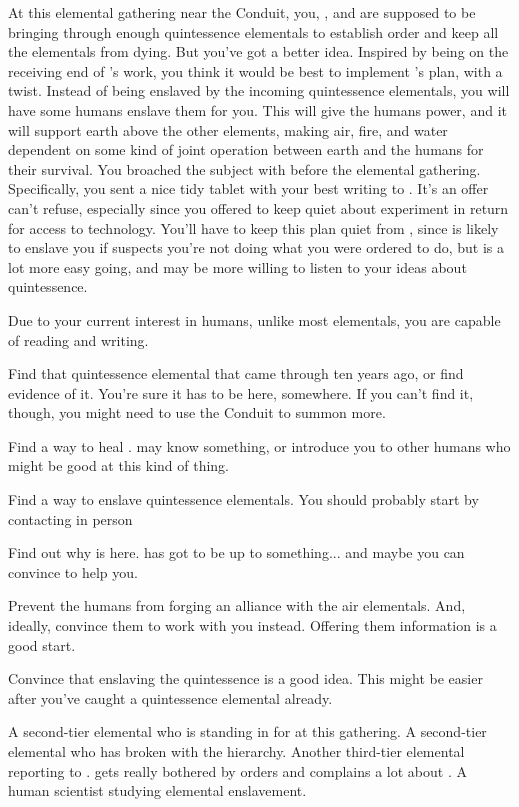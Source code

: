 \documentclass[char]{elementals}
\begin{document}
At this elemental gathering near the Conduit, you, \cLoyal{}, and \cMiniEarth{} are supposed to be bringing through enough quintessence elementals to establish order and keep all the elementals from dying.  But you've got a better idea.  Inspired by being on the receiving end of \cMS{}'s work, you think it would be best to implement \cLoyal{}'s plan, with a twist.  Instead of being enslaved by the incoming quintessence elementals, you will have some humans enslave them for you.  This will give the humans power, and it will support earth above the other elements, making air, fire, and water dependent on some kind of joint operation between earth and the humans for their survival.  You broached the subject with \cMS{} before the elemental gathering.  Specifically, you sent a nice tidy tablet with your best writing to \cMS{\them}.  It's an offer \cMS{} can't refuse, especially since you offered to keep quiet about \cMS{\their} experiment in return for access to \cMS{\their} technology.  You'll have to keep this plan quiet from \cLoyal{}, since \cLoyal{\they} is likely to enslave you if \cLoyal{\they} suspects you're not doing what you were ordered to do, but \cRogue{} is a lot more easy going, and may be more willing to listen to your ideas about quintessence.

Due to your current interest in humans, unlike most elementals, you are capable of reading and writing.

\begin{itemz}[Goals]
	\item Find that quintessence elemental that came through ten years ago, or find evidence of it.  You're sure it has to be here, somewhere. If you can't find it, though, you might need to use the Conduit to summon more.
	\item Find a way to heal \cEarthKing{}.  \cMS{} may know something, or introduce you to other humans who might be good at this kind of thing.
	\item Find a way to enslave quintessence elementals.  You should probably start by contacting \cMS{} in person
	\item Find out why \cRogue{} is here.  \cRogue{\They} has got to be up to something... and maybe you can convince \cRogue{\them} to help you.
	\item Prevent the humans from forging an alliance with the air elementals.  And, ideally, convince them to work with you instead.  Offering them information is a good start.
	\item Convince \cLoyal{} that enslaving the quintessence is a good idea.  This might be easier after you've caught a quintessence elemental already.
\end{itemz}

\begin{contacts}
	\contact{\cLoyal{}}  A second-tier elemental who is standing in for \cEarthKing{} at this gathering.
	\contact{\cRogue{}}  A second-tier elemental who has broken with the hierarchy.
  \contact{\cMiniEarth{}}  Another third-tier elemental reporting to \cLoyal{}.  \cMiniEarth{\They} gets really bothered by orders and complains a lot about \cLoyal{}.
	\contact{\cMS{}}  A human scientist studying elemental enslavement.
\end{contacts}
\end{document}
